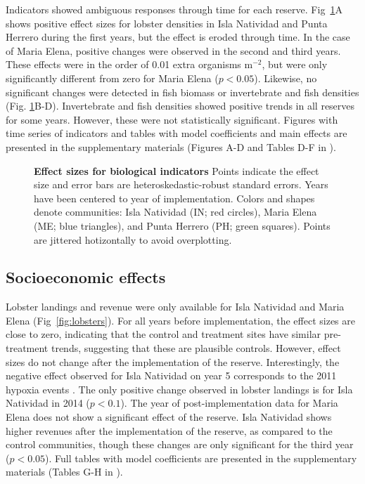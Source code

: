 \documentclass[10pt,letterpaper]{article}
\begin{document}
Indicators showed ambiguous responses through time for each reserve. Fig~\ref{fig:indicators}A shows positive effect sizes for lobster densities in Isla Natividad and Punta Herrero during the first years, but the effect is eroded through time. In the case of Maria Elena, positive changes were observed in the second and third years. These effects were in the order of 0.01 extra organisms $\mathrm{m}^{-2}$, but were only significantly different from zero for Maria Elena ($p < 0.05$). Likewise, no significant changes were detected in fish biomass or invertebrate and fish densities (Fig. \ref{fig:indicators}B-D). Invertebrate and fish densities showed positive trends in all reserves for some years. However, these were not statistically significant. Figures with time series of indicators and tables with model coefficients and main effects are presented in the supplementary materials (Figures A-D and Tables D-F in ).

\begin{figure}[h]
\centering
\caption{{\bf Effect sizes for biological indicators}
Points indicate the effect size and error bars are heteroskedastic-robust standard errors. Years have been centered to year of implementation. Colors and shapes denote communities: Isla Natividad (IN; red circles), Maria Elena (ME; blue triangles), and Punta Herrero (PH; green squares). Points are jittered hotizontally to avoid overplotting.}
\label{fig:indicators}
\end{figure}

\subsection*{Socioeconomic effects}

Lobster landings and revenue were only available for Isla Natividad and Maria Elena (Fig~\ref{fig:lobsters}). For all years before implementation, the effect sizes are close to zero, indicating that the control and treatment sites have similar pre-treatment trends, suggesting that these are plausible controls. However, effect sizes do not change after the implementation of the reserve. Interestingly, the negative effect observed for Isla Natividad on year 5 corresponds to the 2011 hypoxia events \cite{micheli_2012-EU}. The only positive change observed in lobster landings is for Isla Natividad in 2014 ($p < 0.1$). The year of post-implementation data for Maria Elena does not show a significant effect of the reserve. Isla Natividad shows higher revenues after the implementation of the reserve, as compared to the control communities, though these changes are only significant for the third year ($p < 0.05$). Full tables with model coefficients are presented in the supplementary materials (Tables G-H in ).
\end{document}
